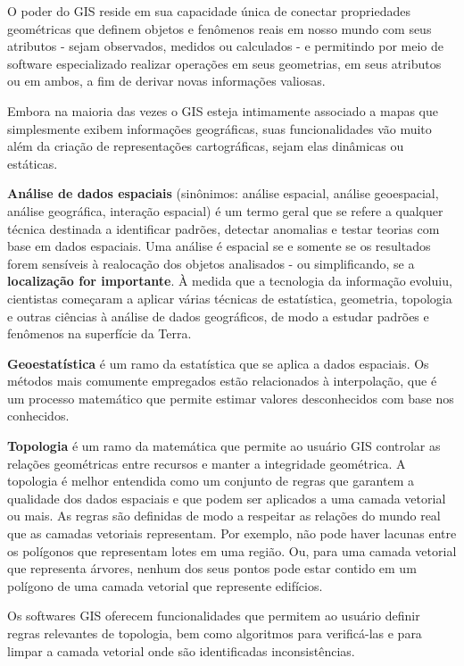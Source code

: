 \documentclass[
]{book}
\begin{document}
O poder do GIS reside em sua capacidade única de conectar propriedades geométricas que definem objetos e fenômenos reais em nosso mundo com seus atributos - sejam observados, medidos ou calculados - e permitindo por meio de software especializado realizar operações em seus geometrias, em seus atributos ou em ambos, a fim de derivar novas informações valiosas.

Embora na maioria das vezes o GIS esteja intimamente associado a mapas que simplesmente exibem informações geográficas, suas funcionalidades vão muito além da criação de representações cartográficas, sejam elas dinâmicas ou estáticas.

\textbf{Análise de dados espaciais} (sinônimos: análise espacial, análise geoespacial, análise geográfica, interação espacial) é um termo geral que se refere a qualquer técnica destinada a identificar padrões, detectar anomalias e testar teorias com base em dados espaciais. Uma análise é espacial se e somente se os resultados forem sensíveis à realocação dos objetos analisados \hspace{0pt}\hspace{0pt}- ou simplificando, se a \textbf{localização for importante}. À medida que a tecnologia da informação evoluiu, cientistas começaram a aplicar várias técnicas de estatística, geometria, topologia e outras ciências à análise de dados geográficos, de modo a estudar padrões e fenômenos na superfície da Terra.

\textbf{Geoestatística} é um ramo da estatística que se aplica a dados espaciais. Os métodos mais comumente empregados estão relacionados à interpolação, que é um processo matemático que permite estimar valores desconhecidos com base nos conhecidos.

\textbf{Topologia} é um ramo da matemática que permite ao usuário GIS controlar as relações geométricas entre recursos e manter a integridade geométrica. A topologia é melhor entendida como um conjunto de regras que garantem a qualidade dos dados espaciais e que podem ser aplicados a uma camada vetorial ou mais. As regras são definidas de modo a respeitar as relações do mundo real que as camadas vetoriais representam. Por exemplo, não pode haver lacunas entre os polígonos que representam lotes em uma região. Ou, para uma camada vetorial que representa árvores, nenhum dos seus pontos pode estar contido em um polígono de uma camada vetorial que represente edifícios.

Os softwares GIS oferecem funcionalidades que permitem ao usuário definir regras relevantes de topologia, bem como algoritmos para verificá-las e para limpar a camada vetorial onde são identificadas inconsistências.
\end{document}
